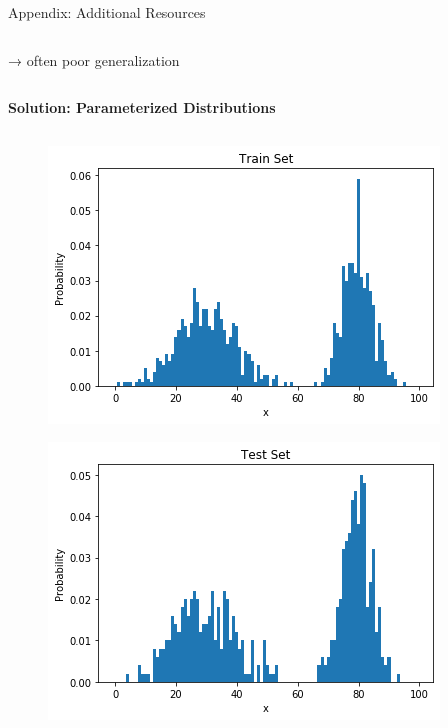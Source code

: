 \begin{frame}[allowframebreaks]{Appendix: Additional Resources}
\begin{columns}
\begin{column}{0.55\textwidth}
        → often poor generalization
    \end{column}
\end{columns}

\framebreak

\large
\textbf{Solution: Parameterized Distributions}
\normalsize
\begin{columns}
    \begin{column}{0.45\textwidth}
        \begin{figure}
            \centering
            \includegraphics[width=\textwidth,keepaspectratio]{images/arm/histogram_training.png}
        \end{figure}
        \begin{figure}
            \centering
            \includegraphics[width=\textwidth,keepaspectratio]{images/arm/histogram_test.png}

\end{figure}
\end{column}
\end{columns}
\end{frame}
